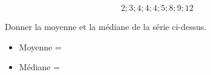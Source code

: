 \documentclass{automatisme}
\begin{document}
\begin{frame}
	$$ 2 ; 3 ; 4 ; 4 ; 4 ; 5 ; 8 ; 9 ; 12 $$

	Donner la moyenne et la médiane de la série ci-dessus.

	\vspace{2em}
	\begin{itemize}
		\setlength{\itemsep}{1.5em}
		\item[] Moyenne = 
		\item[] Médiane = 
	\end{itemize}
\end{frame}
\end{document}
